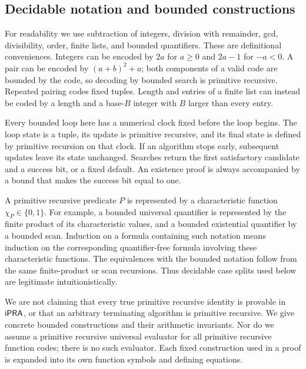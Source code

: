 \subsection{Decidable notation and bounded constructions}

For readability we use subtraction of integers, division with remainder,
gcd, divisibility, order, finite lists, and bounded quantifiers. These are
definitional conveniences. Integers can be encoded by $2a$ for $a\geq0$
and $2a-1$ for $-a<0$. A pair can be encoded by
$(a+b)^2+a$; both components of a valid code are bounded by the code, so
decoding by bounded search is primitive recursive. Repeated pairing codes
fixed tuples. Length and entries of a finite list can instead be coded by
a length and a base-$B$ integer with $B$ larger than every entry.

Every bounded loop here has a numerical clock fixed before the loop begins.
The loop state is a tuple, its update is primitive recursive, and its final
state is defined by primitive recursion on that clock. If an algorithm
stops early, subsequent updates leave its state unchanged. Searches return
the first satisfactory candidate and a success bit, or a fixed default.
An existence proof is always accompanied by a bound that makes the success
bit equal to one.

A primitive recursive predicate $P$ is represented by a characteristic
function $\chi_P\in\{0,1\}$. For example, a bounded universal quantifier is
represented by the finite product of its characteristic values, and a
bounded existential quantifier by a bounded scan. Induction on a formula
containing such notation means induction on the corresponding
quantifier-free formula involving these characteristic functions. The
equivalences with the bounded notation follow from the same finite-product
or scan recursions. Thus decidable case splits used below are legitimate
intuitionistically.

\begin{remark}
We are not claiming that every true primitive recursive identity is
provable in $\mathsf{iPRA}$, or that an arbitrary terminating algorithm is primitive
recursive. We give concrete bounded constructions and their arithmetic
invariants. Nor do we assume a primitive recursive universal evaluator for
all primitive recursive function codes; there is no such evaluator. Each
fixed construction used in a proof is expanded into its own function
symbols and defining equations.
\end{remark}


